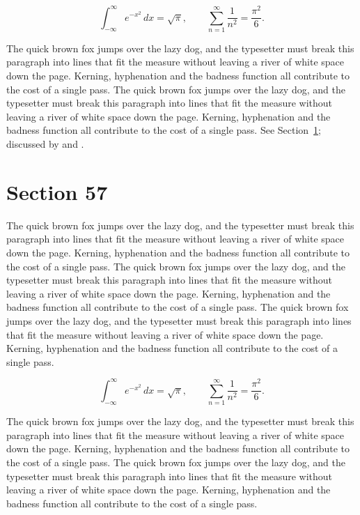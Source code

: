 \documentclass{article}
\begin{document}
\begin{equation}\label{eq:56}
\int_{-\infty}^{\infty} e^{-x^{2}}\,dx = \sqrt{\pi}, \qquad
\sum_{n=1}^{\infty} \frac{1}{n^{2}} = \frac{\pi^{2}}{6}.
\end{equation}

The quick brown fox jumps over the lazy dog, and the typesetter must break this paragraph into lines that fit the measure without leaving a river of white space down the page. Kerning, hyphenation and the badness function all contribute to the cost of a single pass. The quick brown fox jumps over the lazy dog, and the typesetter must break this paragraph into lines that fit the measure without leaving a river of white space down the page. Kerning, hyphenation and the badness function all contribute to the cost of a single pass. 
See Section~\ref{sec:57}; discussed by \textcite{k2} and \textcite{l4}.
\section{Section 57}
\label{sec:57}
The quick brown fox jumps over the lazy dog, and the typesetter must break this paragraph into lines that fit the measure without leaving a river of white space down the page. Kerning, hyphenation and the badness function all contribute to the cost of a single pass. The quick brown fox jumps over the lazy dog, and the typesetter must break this paragraph into lines that fit the measure without leaving a river of white space down the page. Kerning, hyphenation and the badness function all contribute to the cost of a single pass. The quick brown fox jumps over the lazy dog, and the typesetter must break this paragraph into lines that fit the measure without leaving a river of white space down the page. Kerning, hyphenation and the badness function all contribute to the cost of a single pass. 

\begin{equation}\label{eq:57}
\int_{-\infty}^{\infty} e^{-x^{2}}\,dx = \sqrt{\pi}, \qquad
\sum_{n=1}^{\infty} \frac{1}{n^{2}} = \frac{\pi^{2}}{6}.
\end{equation}

The quick brown fox jumps over the lazy dog, and the typesetter must break this paragraph into lines that fit the measure without leaving a river of white space down the page. Kerning, hyphenation and the badness function all contribute to the cost of a single pass. The quick brown fox jumps over the lazy dog, and the typesetter must break this paragraph into lines that fit the measure without leaving a river of white space down the page. Kerning, hyphenation and the badness function all contribute to the cost of a single pass. 
\end{document}
